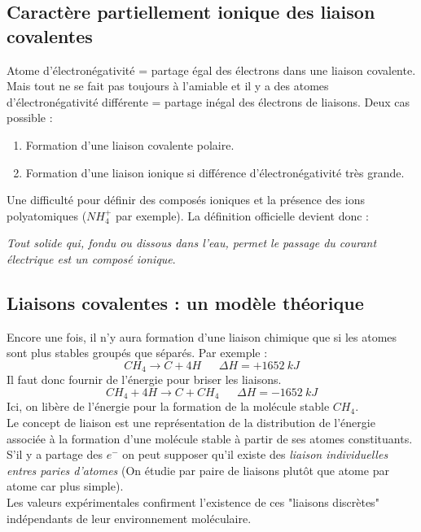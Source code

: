 \documentclass[12pt, a4paper]{article}
\begin{document}
\subsection{Caractère partiellement ionique des liaison covalentes}
Atome d'électronégativité = partage égal des électrons dans une liaison covalente. Mais tout ne se fait pas toujours à l'amiable et il y a des atomes d'électronégativité différente = partage inégal des électrons de liaisons. Deux cas possible : 
\begin{enumerate}
\item Formation d'une liaison covalente polaire.
\item Formation d'une liaison ionique si différence d'électronégativité très grande.
\end{enumerate}
Une difficulté pour définir des composés ioniques et la présence des ions polyatomiques ($NH_4^+$ par exemple). La définition officielle devient donc : 
\begin{center}
\textit{Tout solide qui, fondu ou dissous dans l'eau, permet le passage du courant électrique est un composé ionique}.
\end{center}

\subsection{Liaisons covalentes : un modèle théorique}
Encore une fois, il n'y aura formation d'une liaison chimique que si les atomes sont plus stables groupés que séparés. Par exemple : 
$$CH_4 \rightarrow C + 4H\ \ \ \ \ \ \ \Delta H = + 1652\ kJ$$
Il faut donc fournir de l'énergie pour briser les liaisons.
$$CH_4 + 4H \rightarrow C + CH_4\ \ \ \ \ \ \ \Delta H = - 1652\ kJ$$
Ici, on libère de l'énergie pour la formation de la molécule stable $CH_4$.\\

Le concept de liaison est une représentation de la distribution de l'énergie associée à la formation d'une molécule stable à partir de ses atomes constituants.\\
S'il y a partage des $e^-$ on peut supposer qu'il existe des \textit{liaison individuelles entres paries d'atomes} (On étudie par paire de liaisons plutôt que atome par atome car plus simple).\\

Les valeurs expérimentales confirment l'existence de ces "liaisons discrètes" indépendants de leur environnement moléculaire.
\end{document}

